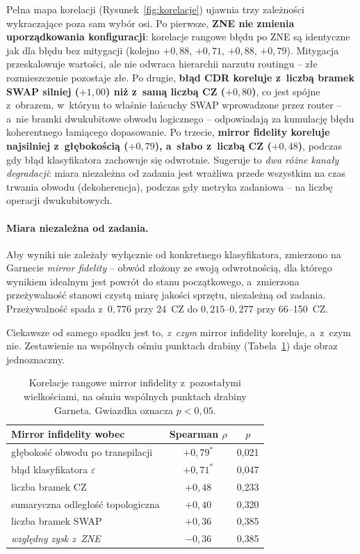 \documentclass[11pt]{article}
\begin{document}
Pełna mapa korelacji (Rysunek~\ref{fig:korelacje}) ujawnia trzy zależności wykraczające poza sam
wybór osi. Po pierwsze, \textbf{ZNE nie zmienia uporządkowania konfiguracji}: korelacje rangowe
błędu po ZNE są identyczne jak dla błędu bez mitygacji (kolejno $+0{,}88$, $+0{,}71$, $+0{,}88$,
$+0{,}79$). Mitygacja przeskalowuje wartości, ale nie odwraca hierarchii narzutu routingu -- złe
rozmieszczenie pozostaje złe. Po drugie, \textbf{błąd CDR koreluje z~liczbą bramek SWAP silniej
($+1{,}00$) niż z~samą liczbą CZ ($+0{,}80$)}, co jest spójne z~obrazem, w~którym to właśnie
łańcuchy SWAP wprowadzone przez router -- a~nie bramki dwukubitowe obwodu logicznego -- odpowiadają
za kumulację błędu koherentnego łamiącego dopasowanie. Po trzecie, \textbf{mirror fidelity
koreluje najsilniej z~głębokością ($+0{,}79$), a~słabo z~liczbą CZ ($+0{,}48$)}, podczas gdy błąd
klasyfikatora zachowuje się odwrotnie. Sugeruje to \emph{dwa różne kanały degradacji}: miara
niezależna od zadania jest wrażliwa przede wszystkim na czas trwania obwodu (dekoherencja), podczas
gdy metryka zadaniowa -- na liczbę operacji dwukubitowych. 

\paragraph{Miara niezależna od zadania.} Aby wyniki nie zależały wyłącznie od konkretnego
klasyfikatora, zmierzono na Garnecie \emph{mirror fidelity} -- obwód złożony ze swoją
odwrotnością, dla którego wynikiem idealnym jest powrót do stanu początkowego, a~zmierzona
przeżywalność stanowi czystą miarę jakości sprzętu, niezależną od zadania. Przeżywalność spada
z~$0{,}776$ przy 24~CZ do $0{,}215$--$0{,}277$ przy 66--150~CZ.

Ciekawsze od samego spadku jest to, \emph{z~czym} mirror infidelity koreluje, a~z~czym nie.
Zestawienie na wspólnych ośmiu punktach drabiny (Tabela~\ref{tab:mirror}) daje obraz jednoznaczny.

\begin{table}[!ht]\centering
\caption{Korelacje rangowe mirror infidelity z~pozostałymi wielkościami, na ośmiu wspólnych
punktach drabiny Garneta. Gwiazdka oznacza $p<0{,}05$.}
\label{tab:mirror}
\begin{tabular}{lcc}
\toprule
Mirror infidelity wobec & Spearman $\rho$ & $p$ \\
\midrule
głębokość obwodu po transpilacji & $+0{,}79^{*}$ & 0{,}021 \\
błąd klasyfikatora $\varepsilon$ & $+0{,}71^{*}$ & 0{,}047 \\
liczba bramek CZ & $+0{,}48$ & 0{,}233 \\
sumaryczna odległość topologiczna & $+0{,}40$ & 0{,}320 \\
liczba bramek SWAP & $+0{,}36$ & 0{,}385 \\
\midrule
\emph{względny zysk z~ZNE} & $-0{,}36$ & 0{,}385 \\
\bottomrule
\end{tabular}
\end{table}
\end{document}

